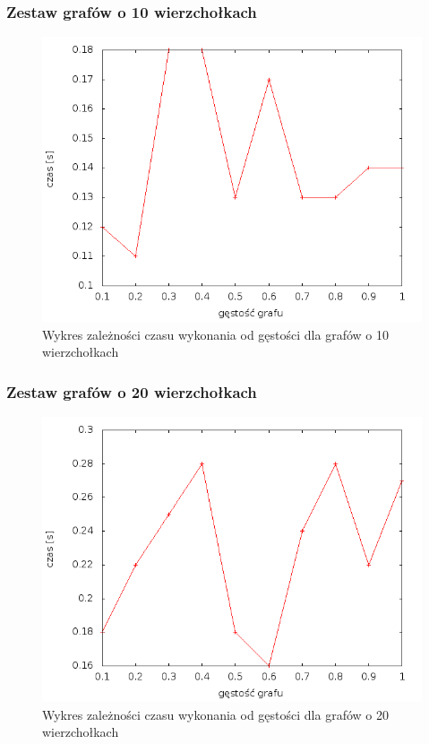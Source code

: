 \documentclass[12pt, a4paper]{article}
\begin{document}
\subsubsection*{Zestaw grafów o 10 wierzchołkach}
\begin{figure}[!h]
    \begin{center}
	\includegraphics[scale=0.5]{../experiment_1/img/dim/dim_10.png}
	\caption{Wykres zależności czasu wykonania od gęstości dla grafów o 10 wierzchołkach}
    \end{center}
\end{figure}
\FloatBarrier
\subsubsection*{Zestaw grafów o 20 wierzchołkach}
\begin{figure}[!h]
    \begin{center}
	\includegraphics[scale=0.5]{../experiment_1/img/dim/dim_20.png}
	\caption{Wykres zależności czasu wykonania od gęstości dla grafów o 20 wierzchołkach}
    \end{center}
\end{figure}
\FloatBarrier
\newpage
\end{document}
